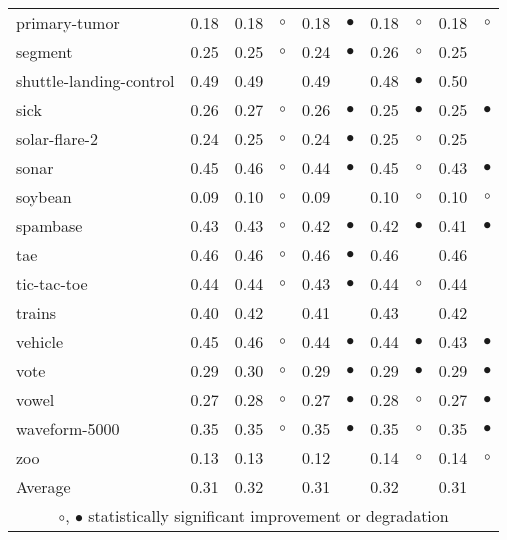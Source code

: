{\begin{longtable}{lrr@{\hspace{0.1cm}}cr@{\hspace{0.1cm}}cr@{\hspace{0.1cm}}cr@{\hspace{0.1cm}}c}
primary-tumor & 0.18 & 0.18 &   $\circ$ & 0.18 & $\bullet$ & 0.18 &   $\circ$ & 0.18 &    $\circ$\\
segment & 0.25 & 0.25 &   $\circ$ & 0.24 & $\bullet$ & 0.26 &   $\circ$ & 0.25 &           \\
shuttle-landing-control & 0.49 & 0.49 &           & 0.49 &           & 0.48 & $\bullet$ & 0.50 &           \\
sick & 0.26 & 0.27 &   $\circ$ & 0.26 & $\bullet$ & 0.25 & $\bullet$ & 0.25 &  $\bullet$\\
solar-flare-2 & 0.24 & 0.25 &   $\circ$ & 0.24 & $\bullet$ & 0.25 &   $\circ$ & 0.25 &           \\
sonar & 0.45 & 0.46 &   $\circ$ & 0.44 & $\bullet$ & 0.45 &   $\circ$ & 0.43 &  $\bullet$\\
soybean & 0.09 & 0.10 &   $\circ$ & 0.09 &           & 0.10 &   $\circ$ & 0.10 &    $\circ$\\
spambase & 0.43 & 0.43 &   $\circ$ & 0.42 & $\bullet$ & 0.42 & $\bullet$ & 0.41 &  $\bullet$\\
tae & 0.46 & 0.46 &   $\circ$ & 0.46 & $\bullet$ & 0.46 &           & 0.46 &           \\
tic-tac-toe & 0.44 & 0.44 &   $\circ$ & 0.43 & $\bullet$ & 0.44 &   $\circ$ & 0.44 &           \\
trains & 0.40 & 0.42 &           & 0.41 &           & 0.43 &           & 0.42 &           \\
vehicle & 0.45 & 0.46 &   $\circ$ & 0.44 & $\bullet$ & 0.44 & $\bullet$ & 0.43 &  $\bullet$\\
vote & 0.29 & 0.30 &   $\circ$ & 0.29 & $\bullet$ & 0.29 & $\bullet$ & 0.29 &  $\bullet$\\
vowel & 0.27 & 0.28 &   $\circ$ & 0.27 & $\bullet$ & 0.28 &   $\circ$ & 0.27 &  $\bullet$\\
waveform-5000 & 0.35 & 0.35 &   $\circ$ & 0.35 & $\bullet$ & 0.35 &   $\circ$ & 0.35 &  $\bullet$\\
zoo & 0.13 & 0.13 &           & 0.12 &           & 0.14 &   $\circ$ & 0.14 &    $\circ$\\
\hline
Average & 0.31 & 0.32 &           & 0.31 &           & 0.32 &           & 0.31 &           \\
\hline
\multicolumn{10}{c}{$\circ$, $\bullet$ statistically significant improvement or degradation}\\
\end{longtable} \footnotesize \par}
